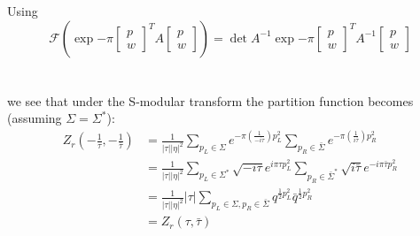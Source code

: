 \documentclass[11pt,aspectratio=169]{beamer}
\begin{document}
\begin{frame}
	Using
	\begin{equation}
		\mathcal{F}(\exp{-\pi\begin{bmatrix} p \\ w \end{bmatrix}^T A \begin{bmatrix} p \\ w \end{bmatrix}}) = \det{A}^{-1}\exp{-\pi\begin{bmatrix} p \\ w \end{bmatrix}^T A^{-1} \begin{bmatrix} p \\ w \end{bmatrix}}
	\end{equation}
	\\~\\
	we see that under the S-modular transform the partition function becomes (assuming $\Sigma = \Sigma^*$):
	\begin{align*}
		Z_r (-\frac{1}{\tau}, -\frac{1}{\bar{\tau}}) &= \frac{1}{|\tau||\eta|^2} \sum_{p_L\in\Sigma}e^{-\pi(\frac{1}{-i\tau})p_L^2}\sum_{p_R\in\bar{\Sigma}}e^{-\pi(\frac{1}{i\bar{\tau}})p_R^2} \\
		&= \frac{1}{|\tau||\eta|^2} \sum_{p_L\in\Sigma^*} \sqrt{-i\tau} e^{i\pi\tau p_L^2} \sum_{p_R\in\bar{\Sigma}^*} \sqrt{i\bar{\tau}} e^{-i\pi\bar{\tau}p_R^2} \\
		&= \frac{1}{|\tau||\eta|^2} |\tau| \sum_{p_L\in\Sigma, p_R\in\bar{\Sigma}} q^{\frac{1}{2}p_L^2}\bar{q}^{\frac{1}{2}p_R^2} \\
		&= Z_r (\tau, \bar{\tau})
	\end{align*}
\end{frame}
\end{document}
